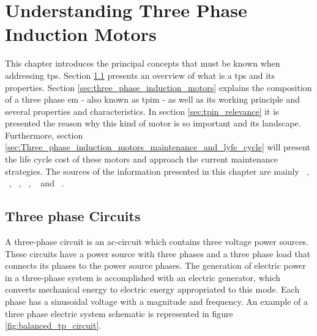 \chapter{Understanding Three Phase Induction Motors}
\label{cha:intro_electric_motors}



This chapter introduces the principal concepts that must be known when addressing \acrfull{tps}. Section \ref{sec:three_phase_systems} presents an overview of what is a \acrshort{tps} and its properties. Section \ref{sec:three_phase_induction_motors} explains the composition of a three phase \acrfull{em} - also known as \acrfull{tpim} - as well as its working principle and several properties and characteristics. In section \ref{sec:tpin_relevance} it is presented the reason why this kind of motor is so important and its landscape. Furthermore, section \ref{sec:Three_phase_induction_motors_maintenance_and_lyfe_cycle} will present the life cycle cost of these motors and approach the current maintenance strategies. The sources of the information presented in this chapter are mainly ~\cite{Helfenstein2000}, ~\cite{Alves2003}, ~\cite{Fitzgerald1985}, ~\cite{Guru2001}, ~\cite{Rashid2011} and ~\cite{Ferreira1}.

\section{Three phase Circuits} %
\label{sec:three_phase_systems}

A three-phase circuit is an \acrshort{ac}-circuit which contains three voltage power sources. These circuits have a power source with three phases and a three phase load that connects its phases to the power source phases. The generation of electric power in a three-phase system is accomplished with an electric generator, which converts mechanical energy to electric energy appropriated to this mode. Each phase has a sinusoidal voltage with a magnitude and frequency. An example of a three phase electric system schematic is represented in figure \ref{fig:balanced_tp_circuit}.


